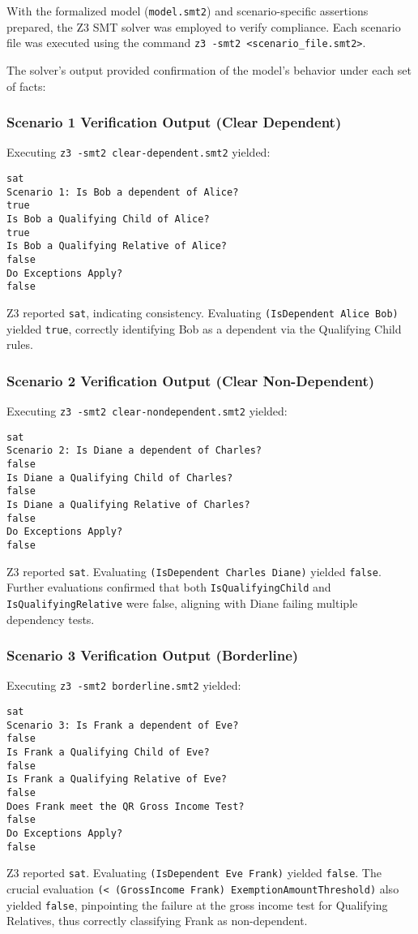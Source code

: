 \documentclass[11pt, letterpaper]{article}
\begin{document}
With the formalized model (\texttt{model.smt2}) and scenario-specific assertions prepared, the Z3 SMT solver was employed to verify compliance. Each scenario file was executed using the command \texttt{z3 -smt2 <scenario\_file.smt2>}.

The solver's output provided confirmation of the model's behavior under each set of facts:

\subsubsection{Scenario 1 Verification Output (Clear Dependent)}
Executing \texttt{z3 -smt2 clear-dependent.smt2} yielded:
\begin{lstlisting}[style=outputstyle, caption={Z3 Output for Scenario 1}]
sat
Scenario 1: Is Bob a dependent of Alice?
true
Is Bob a Qualifying Child of Alice?
true
Is Bob a Qualifying Relative of Alice?
false
Do Exceptions Apply?
false
\end{lstlisting}
Z3 reported \texttt{sat}, indicating consistency. Evaluating \texttt{(IsDependent Alice Bob)} yielded \texttt{true}, correctly identifying Bob as a dependent via the Qualifying Child rules.

\subsubsection{Scenario 2 Verification Output (Clear Non-Dependent)}
Executing \texttt{z3 -smt2 clear-nondependent.smt2} yielded:
\begin{lstlisting}[style=outputstyle, caption={Z3 Output for Scenario 2}]
sat
Scenario 2: Is Diane a dependent of Charles?
false
Is Diane a Qualifying Child of Charles?
false
Is Diane a Qualifying Relative of Charles?
false
Do Exceptions Apply?
false
\end{lstlisting}
Z3 reported \texttt{sat}. Evaluating \texttt{(IsDependent Charles Diane)} yielded \texttt{false}. Further evaluations confirmed that both \texttt{IsQualifyingChild} and \texttt{IsQualifyingRelative} were false, aligning with Diane failing multiple dependency tests.

\subsubsection{Scenario 3 Verification Output (Borderline)}
Executing \texttt{z3 -smt2 borderline.smt2} yielded:
\begin{lstlisting}[style=outputstyle, caption={Z3 Output for Scenario 3}]
sat
Scenario 3: Is Frank a dependent of Eve?
false
Is Frank a Qualifying Child of Eve?
false
Is Frank a Qualifying Relative of Eve?
false
Does Frank meet the QR Gross Income Test?
false
Do Exceptions Apply?
false
\end{lstlisting}
Z3 reported \texttt{sat}. Evaluating \texttt{(IsDependent Eve Frank)} yielded \texttt{false}. The crucial evaluation \texttt{(< (GrossIncome Frank) ExemptionAmountThreshold)} also yielded \texttt{false}, pinpointing the failure at the gross income test for Qualifying Relatives, thus correctly classifying Frank as non-dependent.
\end{document}
